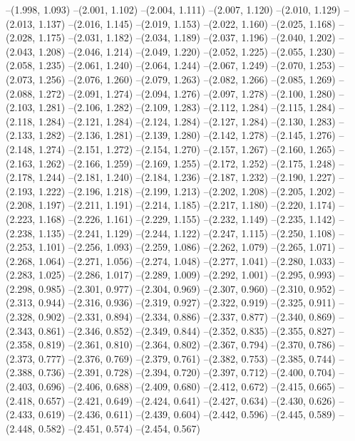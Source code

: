 --(1.998, 1.093)
--(2.001, 1.102)
--(2.004, 1.111)
--(2.007, 1.120)
--(2.010, 1.129)
--(2.013, 1.137)
--(2.016, 1.145)
--(2.019, 1.153)
--(2.022, 1.160)
--(2.025, 1.168)
--(2.028, 1.175)
--(2.031, 1.182)
--(2.034, 1.189)
--(2.037, 1.196)
--(2.040, 1.202)
--(2.043, 1.208)
--(2.046, 1.214)
--(2.049, 1.220)
--(2.052, 1.225)
--(2.055, 1.230)
--(2.058, 1.235)
--(2.061, 1.240)
--(2.064, 1.244)
--(2.067, 1.249)
--(2.070, 1.253)
--(2.073, 1.256)
--(2.076, 1.260)
--(2.079, 1.263)
--(2.082, 1.266)
--(2.085, 1.269)
--(2.088, 1.272)
--(2.091, 1.274)
--(2.094, 1.276)
--(2.097, 1.278)
--(2.100, 1.280)
--(2.103, 1.281)
--(2.106, 1.282)
--(2.109, 1.283)
--(2.112, 1.284)
--(2.115, 1.284)
--(2.118, 1.284)
--(2.121, 1.284)
--(2.124, 1.284)
--(2.127, 1.284)
--(2.130, 1.283)
--(2.133, 1.282)
--(2.136, 1.281)
--(2.139, 1.280)
--(2.142, 1.278)
--(2.145, 1.276)
--(2.148, 1.274)
--(2.151, 1.272)
--(2.154, 1.270)
--(2.157, 1.267)
--(2.160, 1.265)
--(2.163, 1.262)
--(2.166, 1.259)
--(2.169, 1.255)
--(2.172, 1.252)
--(2.175, 1.248)
--(2.178, 1.244)
--(2.181, 1.240)
--(2.184, 1.236)
--(2.187, 1.232)
--(2.190, 1.227)
--(2.193, 1.222)
--(2.196, 1.218)
--(2.199, 1.213)
--(2.202, 1.208)
--(2.205, 1.202)
--(2.208, 1.197)
--(2.211, 1.191)
--(2.214, 1.185)
--(2.217, 1.180)
--(2.220, 1.174)
--(2.223, 1.168)
--(2.226, 1.161)
--(2.229, 1.155)
--(2.232, 1.149)
--(2.235, 1.142)
--(2.238, 1.135)
--(2.241, 1.129)
--(2.244, 1.122)
--(2.247, 1.115)
--(2.250, 1.108)
--(2.253, 1.101)
--(2.256, 1.093)
--(2.259, 1.086)
--(2.262, 1.079)
--(2.265, 1.071)
--(2.268, 1.064)
--(2.271, 1.056)
--(2.274, 1.048)
--(2.277, 1.041)
--(2.280, 1.033)
--(2.283, 1.025)
--(2.286, 1.017)
--(2.289, 1.009)
--(2.292, 1.001)
--(2.295, 0.993)
--(2.298, 0.985)
--(2.301, 0.977)
--(2.304, 0.969)
--(2.307, 0.960)
--(2.310, 0.952)
--(2.313, 0.944)
--(2.316, 0.936)
--(2.319, 0.927)
--(2.322, 0.919)
--(2.325, 0.911)
--(2.328, 0.902)
--(2.331, 0.894)
--(2.334, 0.886)
--(2.337, 0.877)
--(2.340, 0.869)
--(2.343, 0.861)
--(2.346, 0.852)
--(2.349, 0.844)
--(2.352, 0.835)
--(2.355, 0.827)
--(2.358, 0.819)
--(2.361, 0.810)
--(2.364, 0.802)
--(2.367, 0.794)
--(2.370, 0.786)
--(2.373, 0.777)
--(2.376, 0.769)
--(2.379, 0.761)
--(2.382, 0.753)
--(2.385, 0.744)
--(2.388, 0.736)
--(2.391, 0.728)
--(2.394, 0.720)
--(2.397, 0.712)
--(2.400, 0.704)
--(2.403, 0.696)
--(2.406, 0.688)
--(2.409, 0.680)
--(2.412, 0.672)
--(2.415, 0.665)
--(2.418, 0.657)
--(2.421, 0.649)
--(2.424, 0.641)
--(2.427, 0.634)
--(2.430, 0.626)
--(2.433, 0.619)
--(2.436, 0.611)
--(2.439, 0.604)
--(2.442, 0.596)
--(2.445, 0.589)
--(2.448, 0.582)
--(2.451, 0.574)
--(2.454, 0.567)
